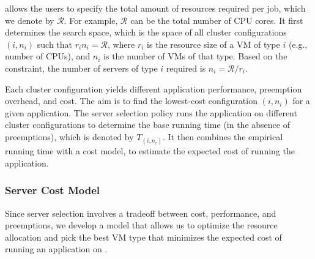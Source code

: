 \sysname allows the users to specify the total amount of resources required per job, which we denote by $\mathcal{R}$.
For example, $\mathcal{R}$ can be the total number of CPU cores. 
It first determines the search space, which is the space of all cluster configurations $(i,n_i)$ such that $r_i n_i = \mathcal{R}$, where $r_i$ is the resource size of a VM of type $i$ (e.g., number of CPUs), and $n_i$ is the number of VMs of that type. 
Based on the constraint, the number of servers of type $i$ required is $n_i = \mathcal{R}/r_i$.

Each cluster configuration yields different application performance, preemption overhead, and cost.
The aim is to find the lowest-cost configuration $(i, n_i)$ for a given application. 
The server selection policy runs the application on different cluster configurations to determine the base running time (in the absence of preemptions), which is denoted by $T_{(i,n_i)}$. 
It then combines the empirical running time with a cost model, to estimate the expected cost of running the application. 

\vspace*{\subsecspace}
\subsubsection{Server Cost Model}
\label{subsec:cost-model}

Since server selection involves a tradeoff between cost, performance, and preemptions, we develop a model that allows us to optimize the resource allocation and pick the best VM type that minimizes the expected cost of running an application on \sysname. 



